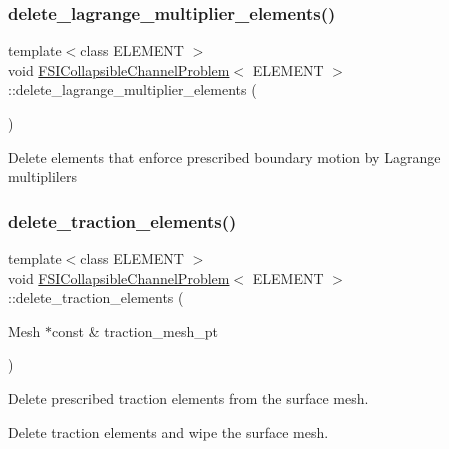 \subsubsection{\texorpdfstring{delete\+\_\+lagrange\+\_\+multiplier\+\_\+elements()}{delete\_lagrange\_multiplier\_elements()}\hspace{0.1cm}{\footnotesize\ttfamily [2/2]}}
{\footnotesize\ttfamily template$<$class E\+L\+E\+M\+E\+NT $>$ \\
void \hyperlink{classFSICollapsibleChannelProblem}{F\+S\+I\+Collapsible\+Channel\+Problem}$<$ E\+L\+E\+M\+E\+NT $>$\+::delete\+\_\+lagrange\+\_\+multiplier\+\_\+elements (\begin{DoxyParamCaption}{ }\end{DoxyParamCaption})\hspace{0.3cm}{\ttfamily [private]}}

Delete elements that enforce prescribed boundary motion by Lagrange multiplilers \mbox{\label{classFSICollapsibleChannelProblem_af1848415423aa824b91357922905a18f}} 
\subsubsection{\texorpdfstring{delete\+\_\+traction\+\_\+elements()}{delete\_traction\_elements()}\hspace{0.1cm}{\footnotesize\ttfamily [1/3]}}
{\footnotesize\ttfamily template$<$class E\+L\+E\+M\+E\+NT $>$ \\
void \hyperlink{classFSICollapsibleChannelProblem}{F\+S\+I\+Collapsible\+Channel\+Problem}$<$ E\+L\+E\+M\+E\+NT $>$\+::delete\+\_\+traction\+\_\+elements (\begin{DoxyParamCaption}\item[{Mesh $\ast$const \&}]{traction\+\_\+mesh\+\_\+pt }\end{DoxyParamCaption})\hspace{0.3cm}{\ttfamily [private]}}



Delete prescribed traction elements from the surface mesh. 

Delete traction elements and wipe the surface mesh. 


